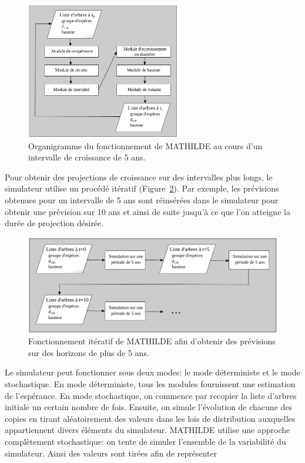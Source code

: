 \documentclass[a4paper,12pt]{article}
\begin{document}
\begin{figure}[h]
\begin{center}
\includegraphics[width=0.6\textwidth]{./figures/flowchart_fr}
\caption{Organigramme du fonctionnement de MATHILDE au cours d'un intervalle de croissance de 5 ans.}
\label{figureOrganigramme}
\end{center}
\end{figure}

Pour obtenir des projections de croissance sur des intervalles plus longs, le simulateur utilise un procédé itératif (Figure~\ref{figureSimulIter}). Par exemple, les prévisions obtenues pour un intervalle de 5 ans sont réinsérées dans le simulateur pour obtenir une prévision sur 10 ans et ainsi de suite jusqu'à ce que l'on atteigne la durée de projection désirée.

\begin{figure}[h]
\begin{center}
\includegraphics[width=\textwidth]{./figures/simulIter_fr}
\caption{Fonctionnement itératif de MATHILDE afin d'obtenir des prévisions sur des horizons de plus de 5 ans.}
\label{figureSimulIter}
\end{center}
\end{figure}

Le simulateur peut fonctionner sous deux modes: le mode déterministe et le mode stochastique. En mode déterministe, tous les modules fournissent une estimation de l'espérance. En mode stochastique, on commence par recopier la liste d'arbres initiale un certain nombre de fois. Ensuite, on simule l'évolution de chacune des copies en tirant aléatoirement des valeurs dans les lois de distribution auxquelles appartiennent divers éléments du simulateur. MATHILDE utilise une approche complètement stochastique: on tente de simuler l'ensemble de la variabilité du simulateur. Ainsi des valeurs sont tirées afin de représenter 
\end{document}
